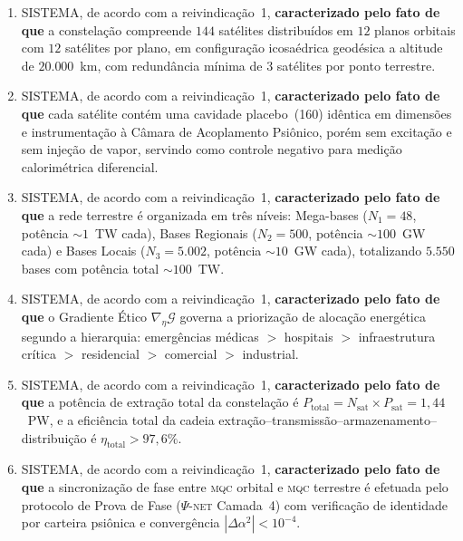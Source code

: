 \documentclass[12pt,a4paper]{article}
\newcommand{\alphaii}{\alpha^2}
\newcommand{\Psifield}{\Psi}
\newcommand{\MQC}{\textsc{mqc}}
\newcommand{\PsiNET}{$\Psifield$-\textsc{net}}
\begin{document}
\begin{enumerate}[label=\textbf{\arabic*.}, leftmargin=*, itemsep=0.8em]
\begin{enumerate}[label=(\alph*)]
sendo que o sistema opera sob condição de acoplamento governada pela Constante de Miguel $\alphaii = 0{,}012$ e incorpora validação experimental por protocolo de duplo trilho com calorimetria diferencial e cegamento duplo.
\end{enumerate}


\item SISTEMA, de acordo com a reivindicação~1, \textbf{caracterizado pelo fato de que} a constelação compreende $144$ satélites distribuídos em $12$ planos orbitais com $12$ satélites por plano, em configuração icosaédrica geodésica a altitude de $20{.}000$~km, com redundância mínima de $3$ satélites por ponto terrestre.

\item SISTEMA, de acordo com a reivindicação~1, \textbf{caracterizado pelo fato de que} cada satélite contém uma cavidade placebo~(160) idêntica em dimensões e instrumentação à Câmara de Acoplamento Psiônico, porém sem excitação e sem injeção de vapor, servindo como controle negativo para medição calorimétrica diferencial.

\item SISTEMA, de acordo com a reivindicação~1, \textbf{caracterizado pelo fato de que} a rede terrestre é organizada em três níveis: Mega-bases ($N_1 = 48$, potência $\sim 1$~TW cada), Bases Regionais ($N_2 = 500$, potência $\sim 100$~GW cada) e Bases Locais ($N_3 = 5{.}002$, potência $\sim 10$~GW cada), totalizando $5{.}550$ bases com potência total $\sim 100$~TW.

\item SISTEMA, de acordo com a reivindicação~1, \textbf{caracterizado pelo fato de que} o Gradiente Ético $\nabla_\eta \mathcal{G}$ governa a priorização de alocação energética segundo a hierarquia: emergências médicas $>$ hospitais $>$ infraestrutura crítica $>$ residencial $>$ comercial $>$ industrial.

\item SISTEMA, de acordo com a reivindicação~1, \textbf{caracterizado pelo fato de que} a potência de extração total da constelação é $P_{\text{total}} = N_{\text{sat}} \times P_{\text{sat}} = 1{,}44$~PW, e a eficiência total da cadeia extração--transmissão--armazenamento--distribuição é $\eta_{\text{total}} > 97{,}6\%$.

\item SISTEMA, de acordo com a reivindicação~1, \textbf{caracterizado pelo fato de que} a sincronização de fase entre \MQC{} orbital e \MQC{} terrestre é efetuada pelo protocolo de Prova de Fase (\PsiNET{} Camada~4) com verificação de identidade por carteira psiônica e convergência $|\Delta\alphaii| < 10^{-4}$.


\end{enumerate}
\end{document}
